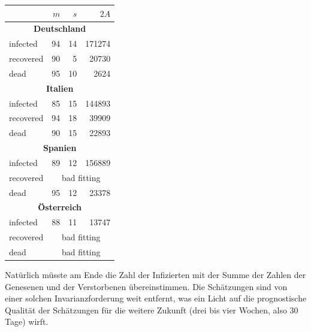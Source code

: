 \documentclass[a4paper,11pt]{article}
\begin{document}
\begin{center}
  \begin{tabular}{|l|r|r|r|}\hline
    & $m$ & $s$ & $2A$ \\\hline
    \multicolumn{4}{|c|}{\bf Deutschland}\\\hline
    infected   & 94 & 14 & 171274\\
    recovered  & 90 &  5 &  20730\\
    dead       & 95 & 10 &   2624\\\hline
    \multicolumn{4}{|c|}{\bf Italien}\\\hline
    infected   & 85 & 15 & 144893\\
    recovered  & 94 & 18 &  39909\\
    dead       & 90 & 15 &  22893\\\hline
    \multicolumn{4}{|c|}{\bf Spanien}\\\hline
    infected   & 89 & 12 & 156889\\
    recovered  & \multicolumn{3}{|c|}{bad fitting}\\
    dead       & 95 & 12 &  23378\\\hline
    \multicolumn{4}{|c|}{\bf Österreich}\\\hline
    infected   & 88 & 11 &  13747\\
    recovered  & \multicolumn{3}{|c|}{bad fitting}\\
    dead       & \multicolumn{3}{|c|}{bad fitting}\\\hline
  \end{tabular}
\end{center}
Natürlich müsste am Ende die Zahl der Infizierten mit der Summe der Zahlen der
Genesenen und der Verstorbenen übereinstimmen.  Die Schätzungen sind von einer
solchen Invarianzforderung weit entfernt, was ein Licht auf die prognostische
Qualität der Schätzungen für die weitere Zukunft (drei bis vier Wochen, also
30 Tage) wirft.
\end{document}
